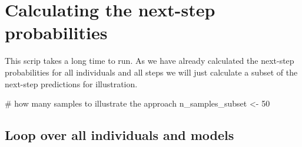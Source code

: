 \documentclass[
  letterpaper,
  DIV=11,
  numbers=noendperiod]{scrartcl}
\newenvironment{Shaded}{\begin{snugshade}}{\end{snugshade}}
\newcommand{\AttributeTok}[1]{\textcolor[rgb]{0.40,0.45,0.13}{#1}}
\newcommand{\CommentTok}[1]{\textcolor[rgb]{0.37,0.37,0.37}{#1}}
\newcommand{\ControlFlowTok}[1]{\textcolor[rgb]{0.00,0.23,0.31}{\textbf{#1}}}
\newcommand{\DecValTok}[1]{\textcolor[rgb]{0.68,0.00,0.00}{#1}}
\newcommand{\FunctionTok}[1]{\textcolor[rgb]{0.28,0.35,0.67}{#1}}
\newcommand{\NormalTok}[1]{\textcolor[rgb]{0.00,0.23,0.31}{#1}}
\newcommand{\OtherTok}[1]{\textcolor[rgb]{0.00,0.23,0.31}{#1}}
\newcommand{\SpecialCharTok}[1]{\textcolor[rgb]{0.37,0.37,0.37}{#1}}
\newcommand{\StringTok}[1]{\textcolor[rgb]{0.13,0.47,0.30}{#1}}
\begin{document}
\begin{Shaded}
\end{Shaded}

\section{Calculating the next-step
probabilities}\label{calculating-the-next-step-probabilities}

This scrip takes a long time to run. As we have already calculated the
next-step probabilities for all individuals and all steps we will just
calculate a subset of the next-step predictions for illustration.

\begin{Shaded}
\begin{Highlighting}[]
\CommentTok{\# how many samples to illustrate the approach}
\NormalTok{n\_samples\_subset }\OtherTok{\textless{}{-}} \DecValTok{50}
\end{Highlighting}
\end{Shaded}

\subsection{Loop over all individuals and
models}\label{loop-over-all-individuals-and-models}
\end{document}
